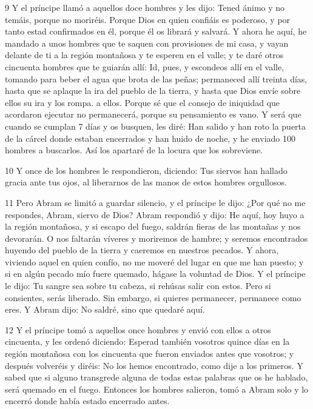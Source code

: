 \par 9 Y el príncipe llamó a aquellos doce hombres y les dijo: Tened ánimo y no temáis, porque no moriréis. Porque Dios en quien confiáis es poderoso, y por tanto estad confirmados en él, porque él os librará y salvará. Y ahora he aquí, he mandado a unos hombres que te saquen con provisiones de mi casa, y vayan delante de ti a la región montañosa y te esperen en el valle; y te daré otros cincuenta hombres que te guiarán allí: Id, pues, y escondeos allí en el valle, tomando para beber el agua que brota de las peñas; permaneced allí treinta días, hasta que se aplaque la ira del pueblo de la tierra, y hasta que Dios envíe sobre ellos su ira y los rompa. a ellos. Porque sé que el consejo de iniquidad que acordaron ejecutar no permanecerá, porque su pensamiento es vano. Y será que cuando se cumplan 7 días y os busquen, les diré: Han salido y han roto la puerta de la cárcel donde estaban encerrados y han huido de noche, y he enviado 100 hombres a buscarlos. Así los apartaré de la locura que los sobreviene.

\par 10 Y once de los hombres le respondieron, diciendo: Tus siervos han hallado gracia ante tus ojos, al liberarnos de las manos de estos hombres orgullosos.

\par 11 Pero Abram se limitó a guardar silencio, y el príncipe le dijo: ¿Por qué no me respondes, Abram, siervo de Dios? Abram respondió y dijo: He aquí, hoy huyo a la región montañosa, y si escapo del fuego, saldrán fieras de las montañas y nos devorarán. O nos faltarán víveres y moriremos de hambre; y seremos encontrados huyendo del pueblo de la tierra y caeremos en nuestros pecados. Y ahora, viviendo aquel en quien confío, no me moveré del lugar en que me han puesto; y si en algún pecado mío fuere quemado, hágase la voluntad de Dios. Y el príncipe le dijo: Tu sangre sea sobre tu cabeza, si rehúsas salir con estos. Pero si consientes, serás liberado. Sin embargo, si quieres permanecer, permanece como eres. Y Abram dijo: No saldré, sino que quedaré aquí.

\par 12 Y el príncipe tomó a aquellos once hombres y envió con ellos a otros cincuenta, y les ordenó diciendo: Esperad también vosotros quince días en la región montañosa con los cincuenta que fueron enviados antes que vosotros; y después volveréis y diréis: No los hemos encontrado, como dije a los primeros. Y sabed que si alguno transgrede alguna de todas estas palabras que os he hablado, será quemado en el fuego. Entonces los hombres salieron, tomó a Abram solo y lo encerró donde había estado encerrado antes.

